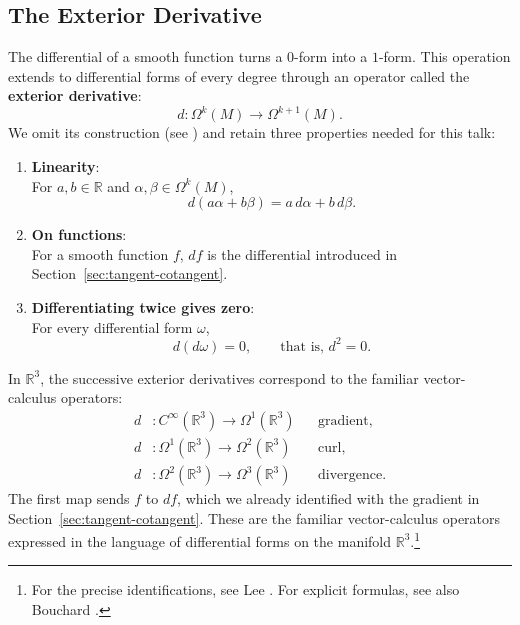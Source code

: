     \subsection{The Exterior Derivative}
    The differential of a smooth function turns a $0$-form into a $1$-form.
    This operation extends to differential forms of every degree through an
    operator called the \textbf{exterior derivative}:
    \begin{equation}
        d \colon \Omega^k(M) \to \Omega^{k+1}(M).
    \end{equation}
    We omit its construction (see \cite[Theorem~14.24, pp.~365--366]{lee2013smooth})
    and retain three properties needed for this talk:
    \begin{enumerate}
        \item \textbf{Linearity}:\\
            For $a,b \in \mathbb{R}$ and $\alpha,\beta \in \Omega^k(M)$,
            \[
                d(a\alpha + b\beta) = a\,d\alpha + b\,d\beta.
            \]
        \item \textbf{On functions}:\\
            For a smooth function $f$, $df$ is the differential introduced in
            Section~\ref{sec:tangent-cotangent}.
        \item \textbf{Differentiating twice gives zero}:\\
            For every differential form $\omega$,
            \[
                d(d\omega) = 0, \qquad \text{that is, } d^2 = 0.
            \]
    \end{enumerate}

    In $\mathbb{R}^3$, the successive exterior derivatives correspond to the
    familiar vector-calculus operators:
    \[
        \begin{aligned}
            d &\colon C^\infty(\mathbb{R}^3) \to \Omega^1(\mathbb{R}^3)
                &&\text{gradient}, \\
            d &\colon \Omega^1(\mathbb{R}^3) \to \Omega^2(\mathbb{R}^3)
                &&\text{curl}, \\
            d &\colon \Omega^2(\mathbb{R}^3) \to \Omega^3(\mathbb{R}^3)
                &&\text{divergence}.
        \end{aligned}
    \]
    The first map sends $f$ to $df$, which we already identified with the
    gradient in Section~\ref{sec:tangent-cotangent}. These are the familiar
    vector-calculus operators expressed in the language of differential forms
    on the manifold $\mathbb{R}^3$.\footnote{%
        For the precise identifications, see Lee
        \cite[Equation~(14.27), p.~368; Exercise~14.28]{lee2013smooth}.
        For explicit formulas, see also Bouchard
        \cite[\S4.4.1, Definitions~4.4.1--4.4.3 and
        Table~4.4.8]{bouchard_exterior_vector}.}

